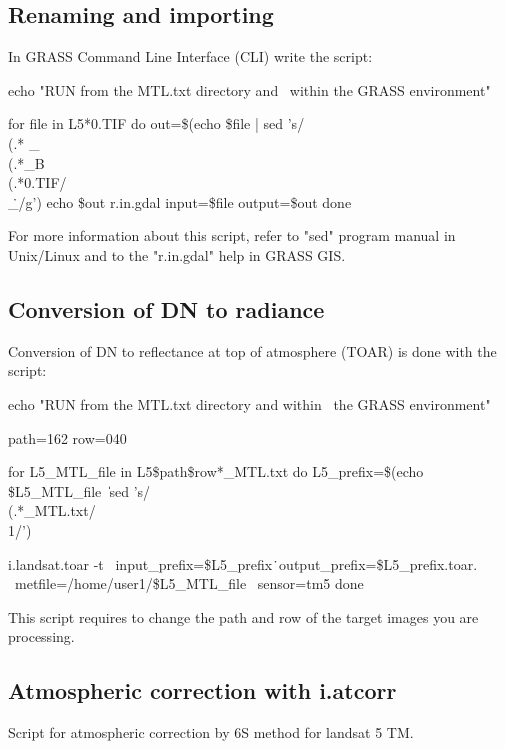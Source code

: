 \subsection{Renaming and importing}
In GRASS Command Line Interface (CLI) write the script:

\begin{smallverbatim}
echo "RUN from the MTL.txt directory and \
 within the GRASS environment"

for file in L5*0.TIF
do
	out=\$(echo \$file | sed 's/\\(.*\) 
        \_\\(.*\)\_B\\(.*\)0.TIF/\1\\_\2\.\3/g')
	echo \$out
	r.in.gdal input=\$file output=\$out
done
\end{smallverbatim}

For more information about this script, refer to "sed" program manual in Unix/Linux and to the "r.in.gdal" help in GRASS GIS.
 
\subsection{Conversion of DN to radiance}
Conversion of DN to reflectance at top of atmosphere (TOAR) is done with the script:

\begin{smallverbatim}
echo "RUN from the MTL.txt directory and within \
 the GRASS environment"

path=162
row=040

for L5_MTL_file in L5\$path\$row*_MTL.txt
do
	L5_prefix=\$(echo \$L5_MTL_file \| \
	  sed 's/\\(.*\)_MTL.txt/\\1/')

	i.landsat.toar -t \
	  input_prefix=\$L5_prefix\. \
	  output_prefix=\$L5_prefix.toar.  \
	  metfile=/home/user1/\$L5\_MTL\_file \
	  sensor=tm5
done
\end{smallverbatim}


This script requires to change the path and row of the target images you are processing.\newline

\subsection{Atmospheric correction with i.atcorr}
Script for atmospheric correction by 6S method for landsat 5 TM.\newline

